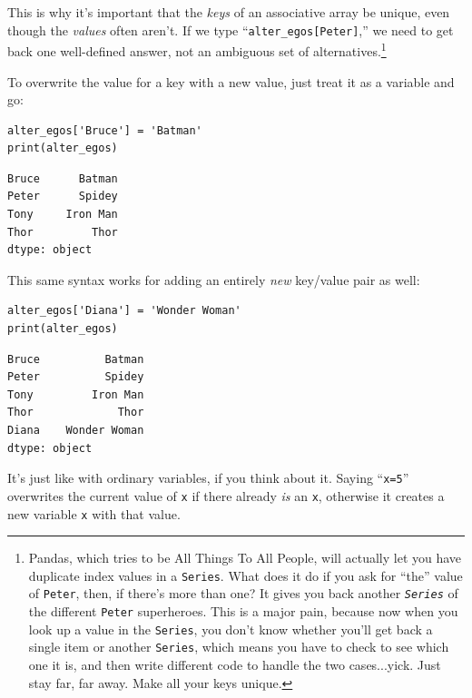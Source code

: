 
This is why it's important that the \textit{keys} of an associative array be
unique, even though the \textit{values} often aren't. If we type
``\texttt{alter\_egos[\textquotesingle Peter\textquotesingle]},'' we need to
get back one well-defined answer, not an ambiguous set of
alternatives.\footnote{Pandas, which tries to be All Things To All
People\texttrademark, will actually let you have duplicate index values in a
\texttt{Series}. What does it do if you ask for ``the'' value of
\texttt{Peter}, then, if there's more than one? It gives you back another
\textit{\texttt{Series}} of the different \texttt{Peter} superheroes. This is a
major pain, because now when you look up a value in the \texttt{Series}, you
don't know whether you'll get back a single item or another \texttt{Series},
which means you have to check to see which one it is, and then write different
code to handle the two cases...yick. Just stay far, far away. Make all your
keys unique.}

To overwrite the value for a key with a new value, just treat it as a variable
and go:

\begin{Verbatim}[fontsize=\small,samepage=true,frame=single,framesep=3mm]
alter_egos['Bruce'] = 'Batman'
print(alter_egos)
\end{Verbatim}

\begin{Verbatim}[fontsize=\small,samepage=true,frame=leftline,framesep=5mm,framerule=1mm]
Bruce      Batman
Peter      Spidey
Tony     Iron Man
Thor         Thor
dtype: object
\end{Verbatim}

This same syntax works for adding an entirely \textit{new} key/value pair as
well:

\begin{Verbatim}[fontsize=\small,samepage=true,frame=single,framesep=3mm]
alter_egos['Diana'] = 'Wonder Woman'
print(alter_egos)
\end{Verbatim}

\begin{Verbatim}[fontsize=\small,samepage=true,frame=leftline,framesep=5mm,framerule=1mm]
Bruce          Batman
Peter          Spidey
Tony         Iron Man
Thor             Thor
Diana    Wonder Woman
dtype: object
\end{Verbatim}

It's just like with ordinary variables, if you think about it. Saying
``\texttt{x=5}'' overwrites the current value of \texttt{x} if there already
\textit{is} an \texttt{x}, otherwise it creates a new variable \texttt{x} with
that value.

